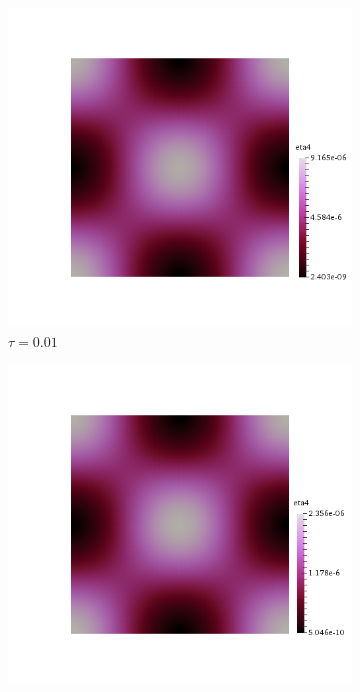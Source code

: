 \mbox{}\\ \\
\begin{figure}[h!]
  \centering
  \begin{subfigure}[b]{0.24\textwidth}
    \includegraphics[width=\textwidth,height=\textheight,keepaspectratio,height=\textheight,keepaspectratio]{figures/2_mpet/default/time/eta4_dt1.png}
    \caption{$\tau=0.01$}
  \end{subfigure}
  \begin{subfigure}[b]{0.24\textwidth}
    \includegraphics[width=\textwidth,height=\textheight,keepaspectratio,height=\textheight,keepaspectratio]{figures/2_mpet/default/time/eta4_dt2.png}

\end{subfigure}
\end{figure}

